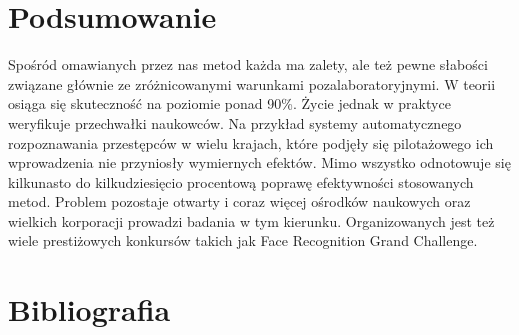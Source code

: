 \documentclass[11pt,a4paper]{article}
\begin{document}
\section{Podsumowanie}

Spośród omawianych przez nas metod każda ma zalety, ale też pewne słabości związane głównie ze zróżnicowanymi warunkami pozalaboratoryjnymi. W teorii osiąga się skuteczność na poziomie ponad 90\%. Życie jednak w praktyce weryfikuje przechwałki naukowców. Na przykład systemy automatycznego rozpoznawania przestępców w wielu krajach, które podjęły się pilotażowego ich wprowadzenia nie przyniosły wymiernych efektów. Mimo wszystko odnotowuje się kilkunasto do kilkudziesięcio procentową poprawę efektywności stosowanych metod. Problem pozostaje otwarty i coraz więcej ośrodków naukowych oraz wielkich korporacji prowadzi badania w tym kierunku. Organizowanych jest też wiele prestiżowych konkursów takich jak Face Recognition Grand Challenge.

\section{Bibliografia}



\end{document}
